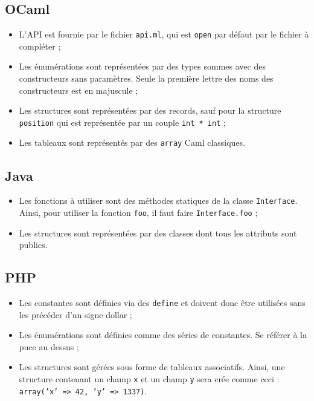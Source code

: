 \subsection{OCaml}

\begin{itemize}
\item{L'API est fournie par le fichier \texttt{api.ml}, qui est \texttt{open}
      par défaut par le fichier à compléter ;}
\item{Les énumérations sont représentées par des types sommes avec des
      constructeurs sans paramètres. Seule la première lettre des noms des
      constructeurs est en majuscule ;}
\item{Les structures sont représentées par des records, sauf pour la structure
      \texttt{position} qui est représentée par un couple \texttt{int * int} ;}
\item{Les tableaux sont représentés par des \texttt{array} Caml classiques.}
\end{itemize}

\subsection{Java}

\begin{itemize}
\item{Les fonctions à utiliser sont des méthodes statiques de la classe
      \texttt{Interface}. Ainsi, pour utiliser la fonction \texttt{foo}, il
      faut faire \texttt{Interface.foo} ;}
\item{Les structures sont représentées par des classes dont tous les attributs
      sont publics.}
\end{itemize}

\subsection{PHP}

\begin{itemize}
\item{Les constantes sont définies via des \texttt{define} et doivent donc être
      utilisées sans les précéder d'un signe dollar ;}
\item{Les énumérations sont définies comme des séries de constantes. Se référer
      à la puce au dessus ;}
\item{Les structures sont gérées sous forme de tableaux associatifs. Ainsi, une
      structure contenant un champ \texttt{x} et un champ \texttt{y} sera crée
      comme ceci : \texttt{array('x' => 42, 'y' => 1337)}.}
\end{itemize}

